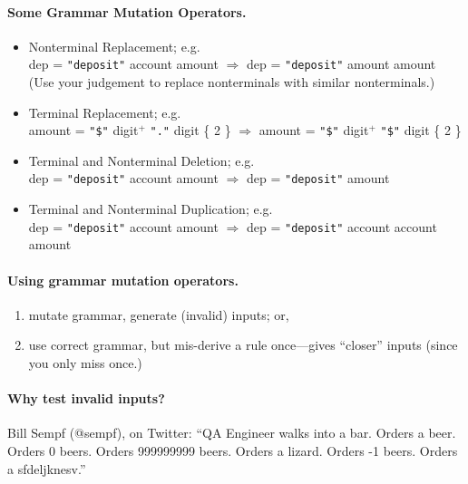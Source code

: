 \documentclass[11pt]{article}
\begin{document}
\paragraph{Some Grammar Mutation Operators.} 
\begin{itemize}
\item Nonterminal Replacement; e.g. \\
{\sf dep = {\tt "deposit"} account amount $\Longrightarrow$
 dep = {\tt "deposit"} amount amount}\\[4em]
(Use your judgement to replace nonterminals with similar nonterminals.)

\item Terminal Replacement; e.g. \\
{\sf amount = {\tt "\$"} digit$^+$ {\tt "."} digit \{ 2 \} 
$\Longrightarrow$ amount = {\tt "\$"} digit$^+$ {\tt "\$"} digit \{ 2 \} } \\[4em]

\item Terminal and Nonterminal Deletion; e.g.\\
{\sf dep = {\tt "deposit"} account amount $\Longrightarrow$
 dep = {\tt "deposit"} amount}\\[4em]

\item Terminal and Nonterminal Duplication; e.g.\\
{\sf dep = {\tt "deposit"} account amount $\Longrightarrow$
 dep = {\tt "deposit"} account account amount}\\[4em]
\end{itemize}

\paragraph{Using grammar mutation operators.}
\begin{enumerate}
\item mutate grammar, generate (invalid) inputs; or,
\item use correct grammar, but mis-derive a rule once---gives ``closer''
inputs (since you only miss once.)
\end{enumerate}

\paragraph{Why test invalid inputs?} Bill Sempf (@sempf), on Twitter: ``QA Engineer walks into a bar. Orders a beer. Orders 0 beers. Orders 999999999 beers. Orders a lizard. Orders -1 beers. Orders a sfdeljknesv.''
\end{document}
